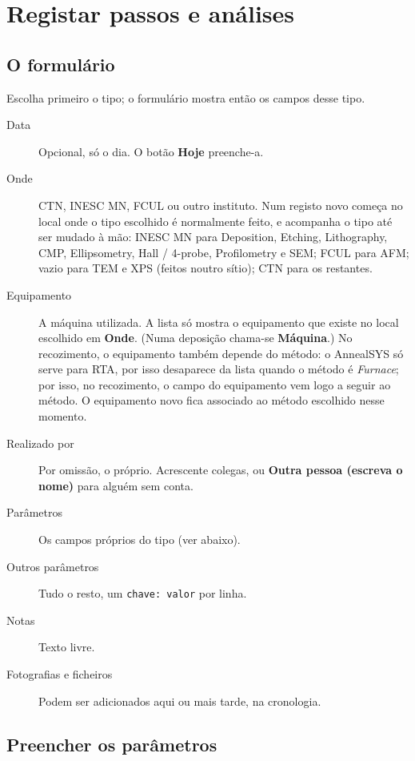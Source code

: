 \documentclass[11pt,a4paper]{article}
\newcommand{\ui}[1]{\textsf{\textbf{#1}}}
\begin{document}
\section{Registar passos e análises}

\subsection{O formulário}

Escolha primeiro o tipo; o formulário mostra então os campos desse tipo.

\begin{description}
  \item[Data] Opcional, só o dia. O botão \ui{Hoje} preenche-a.
  \item[Onde] CTN, INESC MN, FCUL ou outro instituto. Num registo novo
    começa no local onde o tipo escolhido é normalmente feito, e acompanha
    o tipo até ser mudado à mão: INESC MN para Deposition, Etching,
    Lithography, CMP, Ellipsometry, Hall / 4-probe, Profilometry e SEM;
    FCUL para AFM; vazio para TEM e XPS (feitos noutro sítio); CTN para os
    restantes.
  \item[Equipamento] A máquina utilizada. A lista só mostra o equipamento
    que existe no local escolhido em \ui{Onde}. (Numa deposição chama-se
    \ui{Máquina}.) No recozimento, o equipamento também depende do método:
    o AnnealSYS só serve para RTA, por isso desaparece da lista quando o
    método é \emph{Furnace}; por isso, no recozimento, o campo do equipamento
    vem logo a seguir ao método. O equipamento novo fica associado ao método
    escolhido nesse momento.
  \item[Realizado por] Por omissão, o próprio. Acrescente colegas, ou
    \ui{Outra pessoa (escreva o nome)} para alguém sem conta.
  \item[Parâmetros] Os campos próprios do tipo (ver abaixo).
  \item[Outros parâmetros] Tudo o resto, um \texttt{chave: valor} por linha.
  \item[Notas] Texto livre.
  \item[Fotografias e ficheiros] Podem ser adicionados aqui ou mais tarde,
    na cronologia.
\end{description}

\subsection{Preencher os parâmetros}
\end{document}
